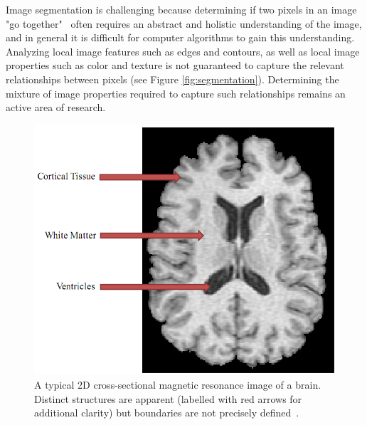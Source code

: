 Image segmentation is challenging because determining if two pixels in an image "go together"~\cite{Szeliski-2010} often requires an abstract and holistic understanding of the image, and in general it is difficult for computer algorithms to gain this understanding. Analyzing local image features such as edges and contours, as well as local image properties such as color and texture is not guaranteed to capture the relevant relationships between pixels (see Figure \ref{fig:segmentation}). Determining the mixture of image properties required to capture such relationships remains an active area of research.

\begin{figure}[t]
\centering
\includegraphics[width=6.0in]{figures/medical-image-with-labels.png}
\caption{A typical 2D cross-sectional magnetic resonance image of a brain. Distinct structures are apparent (labelled with red arrows for additional clarity) but boundaries are not precisely defined~\cite{Pham-1999}.}
\label{fig:medical-image}
\end{figure}
